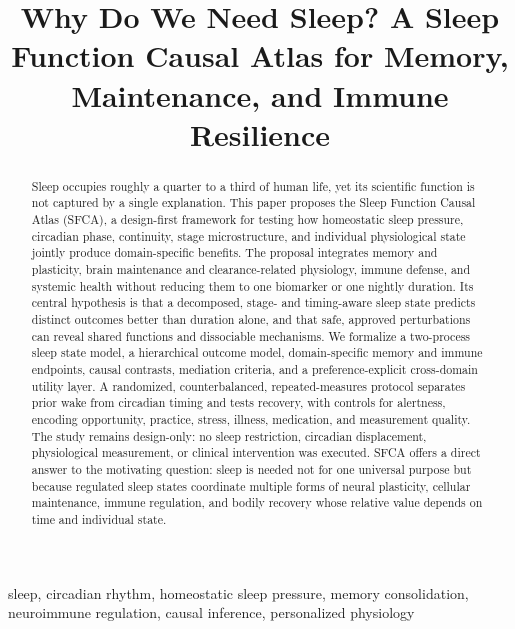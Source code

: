 \documentclass[conference]{IEEEtran}
\begin{document}
\title{Why Do We Need Sleep? A Sleep Function Causal Atlas for Memory, Maintenance, and Immune Resilience}

\author{
}

\maketitle

\begin{abstract}
Sleep occupies roughly a quarter to a third of human life, yet its scientific function is not captured by a single explanation. This paper proposes the Sleep Function Causal Atlas (SFCA), a design-first framework for testing how homeostatic sleep pressure, circadian phase, continuity, stage microstructure, and individual physiological state jointly produce domain-specific benefits. The proposal integrates memory and plasticity, brain maintenance and clearance-related physiology, immune defense, and systemic health without reducing them to one biomarker or one nightly duration. Its central hypothesis is that a decomposed, stage- and timing-aware sleep state predicts distinct outcomes better than duration alone, and that safe, approved perturbations can reveal shared functions and dissociable mechanisms. We formalize a two-process sleep state model, a hierarchical outcome model, domain-specific memory and immune endpoints, causal contrasts, mediation criteria, and a preference-explicit cross-domain utility layer. A randomized, counterbalanced, repeated-measures protocol separates prior wake from circadian timing and tests recovery, with controls for alertness, encoding opportunity, practice, stress, illness, medication, and measurement quality. The study remains design-only: no sleep restriction, circadian displacement, physiological measurement, or clinical intervention was executed. SFCA offers a direct answer to the motivating question: sleep is needed not for one universal purpose but because regulated sleep states coordinate multiple forms of neural plasticity, cellular maintenance, immune regulation, and bodily recovery whose relative value depends on time and individual state.
\end{abstract}

\begin{IEEEkeywords}
sleep, circadian rhythm, homeostatic sleep pressure, memory consolidation, neuroimmune regulation, causal inference, personalized physiology
\end{IEEEkeywords}
\end{document}
